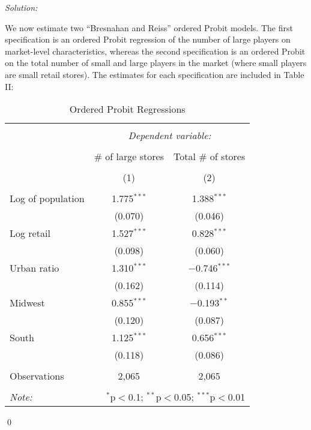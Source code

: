 \documentclass[12pt]{article}
\newenvironment{problem}[2][Problem]{\begin{trivlist}
\item[\hskip \labelsep {\bfseries #1}\hskip \labelsep {\bfseries #2.}]}{\end{trivlist}}
\newenvironment{sol}
    {\emph{Solution:}
    }
    {
    \qed
    }
\begin{document}
\begin{problem}{3}
\end{problem}
\begin{sol}
  We now estimate two ``Bresnahan and Reiss'' ordered Probit models. The first specification is an ordered Probit regression of the number of large players on market-level characteristics, whereas the second specification is an ordered Probit on the total number of small and large players in the market (where small players are small retail stores). The estimates for each specification are included in Table II:
    \begin{table}[!htbp] \centering 
        \caption{Ordered Probit Regressions} 
        \label{} 
      \begin{tabular}{@{\extracolsep{5pt}}lcc} 
      \\[-1.8ex]\hline 
      \hline \\[-1.8ex] 
       & \multicolumn{2}{c}{\textit{Dependent variable:}} \\ 
      \cline{2-3} 
      \\[-1.8ex] & # of large stores & Total # of stores\\ 
      \\[-1.8ex] & (1) & (2)\\ 
      \hline \\[-1.8ex] 
       Log of population & 1.775$^{***}$ & 1.388$^{***}$ \\ 
        & (0.070) & (0.046) \\ 
       Log retail & 1.527$^{***}$ & 0.828$^{***}$ \\ 
        & (0.098) & (0.060) \\ 
       Urban ratio & 1.310$^{***}$ & $-$0.746$^{***}$ \\ 
        & (0.162) & (0.114) \\ 
       Midwest & 0.855$^{***}$ & $-$0.193$^{**}$ \\ 
        & (0.120) & (0.087) \\ 
       South & 1.125$^{***}$ & 0.656$^{***}$ \\ 
        & (0.118) & (0.086) \\ 
      \hline \\[-1.8ex] 
      Observations & 2,065 & 2,065 \\ 
      \hline 
      \hline \\[-1.8ex] 
      \textit{Note:}  & \multicolumn{2}{r}{$^{*}$p$<$0.1; $^{**}$p$<$0.05; $^{***}$p$<$0.01} \\ 
      \end{tabular} 

\end{table}
\end{sol}
\end{document}
